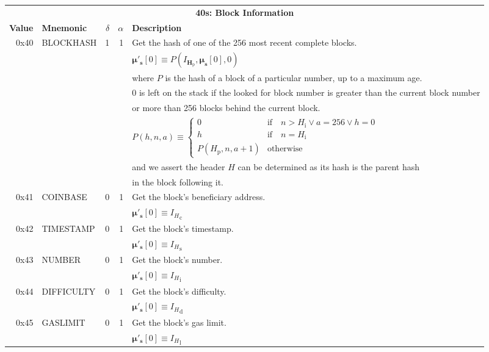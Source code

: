 \documentclass[9pt,oneside]{amsart}
\makeatletter
\newcommand{\linkdest}[1]{\Hy@raisedlink{\hypertarget{#1}{}}}
\makeatother
\begin{document}
\begin{tabular*}{\columnwidth}[h]{rlrrl}
\toprule
\multicolumn{5}{c}{\textbf{40s: Block Information}} \vspace{5pt} \\
\textbf{Value} & \textbf{Mnemonic} & $\delta$ & $\alpha$ & \textbf{Description} \vspace{5pt} \\
0x40 & {\small BLOCKHASH} & 1 & 1 & Get the hash of one of the 256 most recent complete blocks. \\
\linkdest{blockhash}{}&&&& $\boldsymbol{\mu}'_{\mathbf{s}}[0] \equiv P(I_{\mathbf{H}_{\mathrm{p}}}, \boldsymbol{\mu}_{\mathbf{s}}[0], 0)$ \\
&&&& where $P$ is the hash of a block of a particular number, up to a maximum age.\\
&&&& 0 is left on the stack if the looked for block number is greater than the current block number \\
&&&& or more than 256 blocks behind the current block. \\
&&&& $P(h, n, a) \equiv \begin{cases} 0 & \text{if} \quad n > H_{\mathrm{i}} \vee a = 256 \vee h = 0 \\ h & \text{if} \quad n = H_{\mathrm{i}} \\ P(H_{\mathrm{p}}, n, a + 1) & \text{otherwise} \end{cases}$ \\
&&&& and we assert the header $H$ can be determined as its hash is the parent hash \\
&&&& in the block following it. \\
\midrule
0x41 & {\small COINBASE} & 0 & 1 & Get the block's beneficiary address. \\
&&&& $\boldsymbol{\mu}'_{\mathbf{s}}[0] \equiv {I_{H}}_{\mathrm{c}}$ \\
\midrule
0x42 & {\small TIMESTAMP} & 0 & 1 & Get the block's timestamp. \\
&&&& $\boldsymbol{\mu}'_{\mathbf{s}}[0] \equiv {I_{H}}_{\mathrm{s}}$ \\
\midrule
0x43 & {\small NUMBER} & 0 & 1 & Get the block's number. \\
&&&& $\boldsymbol{\mu}'_{\mathbf{s}}[0] \equiv {I_{H}}_{\mathrm{i}}$ \\
\midrule
0x44 & {\small DIFFICULTY} & 0 & 1 & Get the block's difficulty. \\
&&&& $\boldsymbol{\mu}'_{\mathbf{s}}[0] \equiv {I_{H}}_{\mathrm{d}}$ \\
\midrule
0x45 & {\small GASLIMIT} & 0 & 1 & Get the block's gas limit. \\
&&&& $\boldsymbol{\mu}'_{\mathbf{s}}[0] \equiv {I_{H}}_{\mathrm{l}}$ \\
\bottomrule
\end{tabular*}
\end{document}
